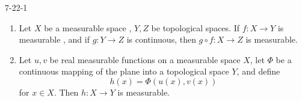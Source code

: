 \documentclass[../main.tex]{subfiles}
\begin{document}
\begin{lemma}{}{7-22-1}
    \begin{enumerate}
        \item Let  \(  X  \) be a measurable space , \(  Y ,Z  \) be topological spaces. If \(  f:X\to Y  \) is measurable , and if  \(  g:Y\to Z  \) is continuous, then     \(  g\circ f :X\to Z  \) is measurable. 
        \item Let \(  u,v  \) be real measurable functions on a measurable space \(  X  \), let \(  \Phi   \) be a continuous mapping of the plane into a topological space \(  Y  \), and define \[
        h\left( x \right)=  \Phi \left( u\left( x \right),v\left( x \right)   \right)  
        \]for  \(  x \in X  \). Then  \(  h: X\to Y  \) is measurable.       
    \end{enumerate}
    
\end{lemma}
\end{document}
